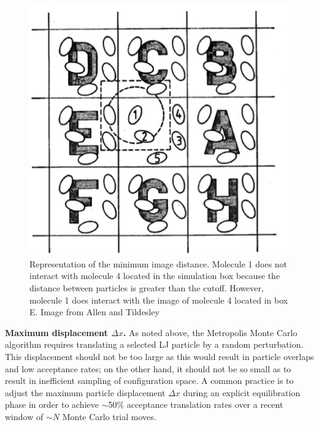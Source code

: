 \documentclass[aip,jcp,preprint,superscriptaddress,floatfix]{revtex4-1}
\begin{document}
\begin{figure}[t]
        \includegraphics[scale = 0.5]{minimumImage.eps}
        \caption{Representation of the minimum image distance. Molecule 1 does not interact with
                molecule 4 located in the simulation box because the distance between particles is
                greater than the cutoff. However, molecule 1 does interact with
                the image of molecule 4 located in box E. Image from Allen and
                Tildesley ~\cite{Allen.Book}}
        \centering
        \label{fig:minimumImage}
\end{figure}

\textbf{Maximum displacement $\Delta x$.} 
As noted above, the Metropolis Monte Carlo algorithm requires translating a selected LJ particle by a random perturbation. 
This displacement should not be too large as this would result in particle overlaps and low acceptance rates; on the other hand, it should not be so small as to result in inefficient sampling of configuration space.
A common practice is to adjust the maximum particle displacement $\Delta x$ during an explicit equilibration phase in order to achieve $\sim$50\% acceptance translation rates over a recent window of $\sim N$ Monte Carlo trial moves. 
\end{document}
